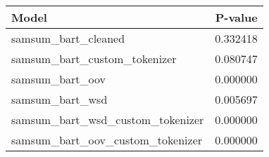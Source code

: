 \begin{tabular}{lr}
\toprule
Model & P-value \\
\midrule
samsum_bart_cleaned & 0.332418 \\
samsum_bart_custom_tokenizer & 0.080747 \\
samsum_bart_oov & 0.000000 \\
samsum_bart_wsd & 0.005697 \\
samsum_bart_wsd_custom_tokenizer & 0.000000 \\
samsum_bart_oov_custom_tokenizer & 0.000000 \\
\bottomrule
\end{tabular}
